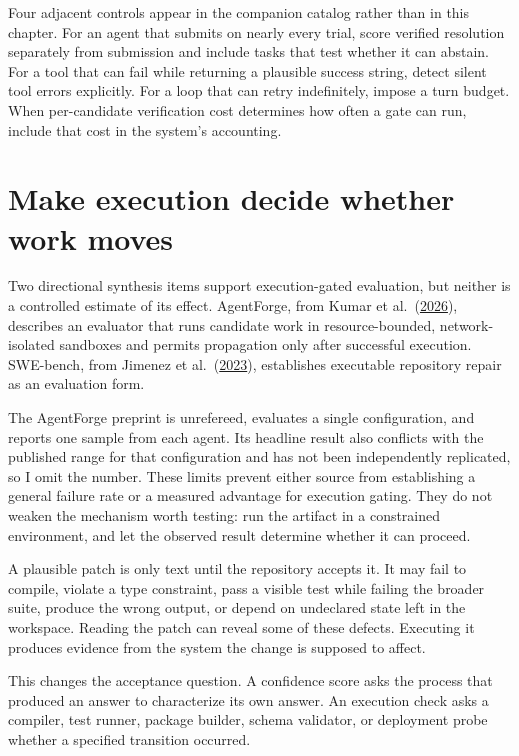 Four adjacent controls appear in the companion catalog rather than in this chapter. For an agent that submits on nearly every trial, score verified resolution separately from submission and include tasks that test whether it can abstain. For a tool that can fail while returning a plausible success string, detect silent tool errors explicitly. For a loop that can retry indefinitely, impose a turn budget. When per-candidate verification cost determines how often a gate can run, include that cost in the system's accounting.

\section{Make execution decide whether work moves}\label{make-execution-decide-whether-work-moves}

Two directional synthesis items support execution-gated evaluation, but neither is a controlled estimate of its effect. AgentForge, from Kumar et al.~(\href{https://arxiv.org/abs/2604.13120}{2026}), describes an evaluator that runs candidate work in resource-bounded, network-isolated sandboxes and permits propagation only after successful execution. SWE-bench, from Jimenez et al.~(\href{https://arxiv.org/abs/2310.06770}{2023}), establishes executable repository repair as an evaluation form.

The AgentForge preprint is unrefereed, evaluates a single configuration, and reports one sample from each agent. Its headline result also conflicts with the published range for that configuration and has not been independently replicated, so I omit the number. These limits prevent either source from establishing a general failure rate or a measured advantage for execution gating. They do not weaken the mechanism worth testing: run the artifact in a constrained environment, and let the observed result determine whether it can proceed.

A plausible patch is only text until the repository accepts it. It may fail to compile, violate a type constraint, pass a visible test while failing the broader suite, produce the wrong output, or depend on undeclared state left in the workspace. Reading the patch can reveal some of these defects. Executing it produces evidence from the system the change is supposed to affect.

This changes the acceptance question. A confidence score asks the process that produced an answer to characterize its own answer. An execution check asks a compiler, test runner, package builder, schema validator, or deployment probe whether a specified transition occurred.


